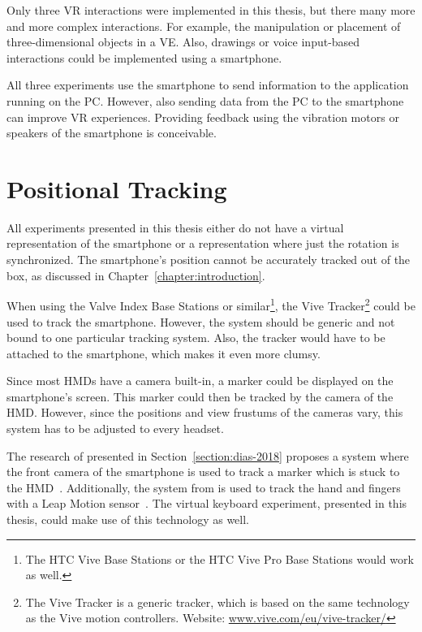 Only three \gls{VR} interactions were implemented in this thesis, but there many more and more complex interactions. For example, the manipulation or placement of three-dimensional objects in a \gls{VE}. Also, drawings or voice input-based interactions could be implemented using a smartphone. %

All three experiments use the smartphone to send information to the application running on the \gls{PC}. However, also sending data from the \gls{PC} to the smartphone can improve \gls{VR} experiences. Providing feedback using the vibration motors or speakers of the smartphone is conceivable.


\section{Positional Tracking}\label{section:fw-positionaTl-tracking}

All experiments presented in this thesis either do not have a virtual representation of the smartphone or a representation where just the rotation is synchronized. The smartphone's position cannot be accurately tracked out of the box, as discussed in Chapter~\ref{chapter:introduction}.

When using the Valve Index Base Stations or similar\footnote{The HTC Vive Base Stations or the HTC Vive Pro Base Stations would work as well.}, the Vive Tracker\footnote{The Vive Tracker is a generic tracker, which is based on the same technology as the Vive motion controllers. Website: \href{https://www.vive.com/eu/vive-tracker/}{www.vive.com/eu/vive-tracker/}} could be used to track the smartphone. However, the system should be generic and not bound to one particular tracking system. Also, the tracker would have to be attached to the smartphone, which makes it even more clumsy.

Since most \glspl{HMD} have a camera built-in, a marker could be displayed on the smartphone's screen. This marker could then be tracked by the camera of the \gls{HMD}. However, since the positions and view frustums of the cameras vary, this system has to be adjusted to every headset.

The research of \citeauthor{Dias.2018} presented in Section~\ref{section:dias-2018} proposes a system where the front camera of the smartphone is used to track a marker which is stuck to the \gls{HMD}~\cite[4]{Dias.2018}. Additionally, the system from \citeauthor{Afonso.2017} is used to track the hand and fingers with a Leap Motion sensor~\cite[247]{Afonso.2017}. The virtual keyboard experiment, presented in this thesis, could make use of this technology as well.
